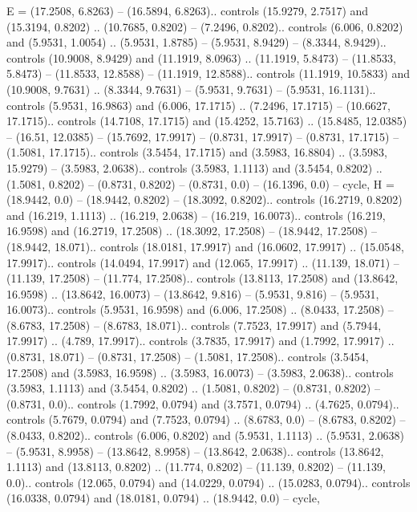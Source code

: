 {E} = {(17.2508, 6.8263) -- (16.5894, 6.8263).. controls (15.9279, 2.7517) and (15.3194, 0.8202) .. (10.7685, 0.8202) -- (7.2496, 0.8202).. controls (6.006, 0.8202) and (5.9531, 1.0054) .. (5.9531, 1.8785) -- (5.9531, 8.9429) -- (8.3344, 8.9429).. controls (10.9008, 8.9429) and (11.1919, 8.0963) .. (11.1919, 5.8473) -- (11.8533, 5.8473) -- (11.8533, 12.8588) -- (11.1919, 12.8588).. controls (11.1919, 10.5833) and (10.9008, 9.7631) .. (8.3344, 9.7631) -- (5.9531, 9.7631) -- (5.9531, 16.1131).. controls (5.9531, 16.9863) and (6.006, 17.1715) .. (7.2496, 17.1715) -- (10.6627, 17.1715).. controls (14.7108, 17.1715) and (15.4252, 15.7163) .. (15.8485, 12.0385) -- (16.51, 12.0385) -- (15.7692, 17.9917) -- (0.8731, 17.9917) -- (0.8731, 17.1715) -- (1.5081, 17.1715).. controls (3.5454, 17.1715) and (3.5983, 16.8804) .. (3.5983, 15.9279) -- (3.5983, 2.0638).. controls (3.5983, 1.1113) and (3.5454, 0.8202) .. (1.5081, 0.8202) -- (0.8731, 0.8202) -- (0.8731, 0.0) -- (16.1396, 0.0) -- cycle},
{H} = {(18.9442, 0.0) -- (18.9442, 0.8202) -- (18.3092, 0.8202).. controls (16.2719, 0.8202) and (16.219, 1.1113) .. (16.219, 2.0638) -- (16.219, 16.0073).. controls (16.219, 16.9598) and (16.2719, 17.2508) .. (18.3092, 17.2508) -- (18.9442, 17.2508) -- (18.9442, 18.071).. controls (18.0181, 17.9917) and (16.0602, 17.9917) .. (15.0548, 17.9917).. controls (14.0494, 17.9917) and (12.065, 17.9917) .. (11.139, 18.071) -- (11.139, 17.2508) -- (11.774, 17.2508).. controls (13.8113, 17.2508) and (13.8642, 16.9598) .. (13.8642, 16.0073) -- (13.8642, 9.816) -- (5.9531, 9.816) -- (5.9531, 16.0073).. controls (5.9531, 16.9598) and (6.006, 17.2508) .. (8.0433, 17.2508) -- (8.6783, 17.2508) -- (8.6783, 18.071).. controls (7.7523, 17.9917) and (5.7944, 17.9917) .. (4.789, 17.9917).. controls (3.7835, 17.9917) and (1.7992, 17.9917) .. (0.8731, 18.071) -- (0.8731, 17.2508) -- (1.5081, 17.2508).. controls (3.5454, 17.2508) and (3.5983, 16.9598) .. (3.5983, 16.0073) -- (3.5983, 2.0638).. controls (3.5983, 1.1113) and (3.5454, 0.8202) .. (1.5081, 0.8202) -- (0.8731, 0.8202) -- (0.8731, 0.0).. controls (1.7992, 0.0794) and (3.7571, 0.0794) .. (4.7625, 0.0794).. controls (5.7679, 0.0794) and (7.7523, 0.0794) .. (8.6783, 0.0) -- (8.6783, 0.8202) -- (8.0433, 0.8202).. controls (6.006, 0.8202) and (5.9531, 1.1113) .. (5.9531, 2.0638) -- (5.9531, 8.9958) -- (13.8642, 8.9958) -- (13.8642, 2.0638).. controls (13.8642, 1.1113) and (13.8113, 0.8202) .. (11.774, 0.8202) -- (11.139, 0.8202) -- (11.139, 0.0).. controls (12.065, 0.0794) and (14.0229, 0.0794) .. (15.0283, 0.0794).. controls (16.0338, 0.0794) and (18.0181, 0.0794) .. (18.9442, 0.0) -- cycle},
